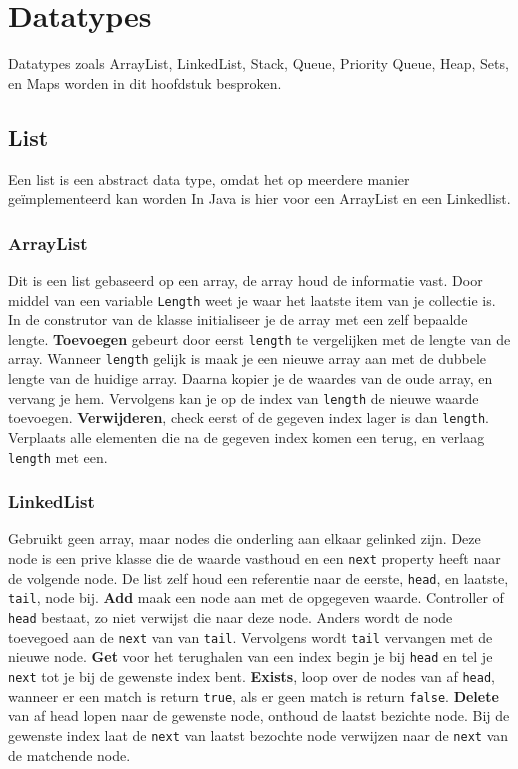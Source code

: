 \section{Datatypes}
Datatypes zoals ArrayList, LinkedList, Stack, Queue, Priority Queue, Heap, Sets, en Maps worden in dit hoofdstuk besproken.

\subsection{List}
Een list is een abstract data type, omdat het op meerdere manier geïmplementeerd kan worden
In Java is hier voor een ArrayList en een Linkedlist.

\subsubsection{ArrayList}
Dit is een list gebaseerd op een array, de array houd de informatie vast.
Door middel van een variable \texttt{Length} weet je waar het laatste item van je collectie is.
In de construtor van de klasse initialiseer je de array met een zelf bepaalde lengte.
\textbf{Toevoegen} gebeurt door eerst \texttt{length} te vergelijken met de lengte van de array.
Wanneer \texttt{length} gelijk is maak je een nieuwe array aan met de dubbele lengte van de huidige array.
Daarna kopier je de waardes van de oude array, en vervang je hem.
Vervolgens kan je op de index van \texttt{length} de nieuwe waarde toevoegen.
\textbf{Verwijderen}, check eerst of de gegeven index lager is dan \texttt{length}.
Verplaats alle elementen die na de gegeven index komen een terug, en verlaag \texttt{length} met een.

\subsubsection{LinkedList}
Gebruikt geen array, maar nodes die onderling aan elkaar gelinked zijn.
Deze node is een prive klasse die de waarde vasthoud en een \texttt{next} property heeft naar de volgende node.
De list zelf houd een referentie naar de eerste, \texttt{head}, en laatste, \texttt{tail}, node bij.
\textbf{Add} maak een node aan met de opgegeven waarde.
Controller of \texttt{head} bestaat, zo niet verwijst die naar deze node.
Anders wordt de node toevegoed aan de \texttt{next} van van \texttt{tail}.
Vervolgens wordt \texttt{tail} vervangen met de nieuwe node.
\textbf{Get} voor het terughalen van een index begin je bij \texttt{head} en tel je \texttt{next} tot je bij de gewenste index bent.
\textbf{Exists}, loop over de nodes van af \texttt{head}, wanneer er een match is return \texttt{true}, als er geen match is return \texttt{false}.
\textbf{Delete} van af head lopen naar de gewenste node, onthoud de laatst bezichte node. Bij de gewenste index laat de \texttt{next} van laatst bezochte node verwijzen naar de \texttt{next} van de matchende node.

